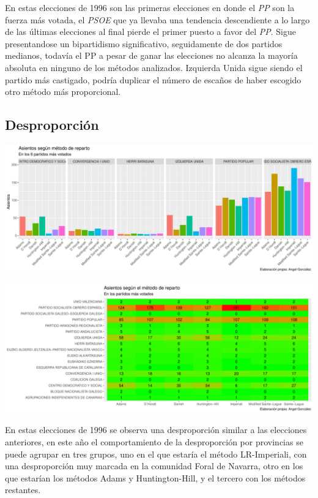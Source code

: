 \documentclass[12pt,a4paper,]{book}
\numberwithin{dummy}{section}
\theoremstyle{ocrenumbox}
\theoremstyle{blacknumex}
\theoremstyle{blacknumbox}
\theoremstyle{ocrenum}
\theoremstyle{ocrenum}
\begin{document}
En estas elecciones de 1996 son las primeras elecciones en donde el
\emph{PP} son la fuerza más votada, el \emph{PSOE} que ya llevaba una
tendencia descendiente a lo largo de las últimas elecciones al final
pierde el primer puesto a favor del \emph{PP}. Sigue presentandose un
bipartidismo significativo, seguidamente de dos partidos medianos,
todavía el PP a pesar de ganar las elecciones no alcanza la mayoría
absoluta en ninguno de los métodos analizados. Izquierda Unida sigue
siendo el partido más castigado, podría duplicar el número de escaños de
haber escogido otro método más proporcional.

\hypertarget{desproporciuxf3n-6}{%
\subsection{Desproporción}\label{desproporciuxf3n-6}}

\begin{center}\includegraphics[width=1\linewidth]{figurasR/unnamed-chunk-95-1} \end{center}

\begin{center}\includegraphics[width=1\linewidth]{figurasR/unnamed-chunk-95-2} \end{center}

En estas elecciones de 1996 se observa una desproporción similar a las
elecciones anteriores, en este año el comportamiento de la desproporción
por provincias se puede agrupar en tres grupos, uno en el que estaría el
método LR-Imperiali, con una desproporción muy marcada en la comunidad
Foral de Navarra, otro en los que estarían los métodos Adams y
Huntington-Hill, y el tercero con los métodos restantes.
\end{document}
